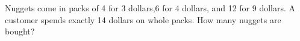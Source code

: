 Nuggets come in packs of 4 for 3 dollars,6 for 4 dollars, and 12 for 9 dollars. A customer spends exactly 14 dollars on whole packs. How many nuggets are bought?
